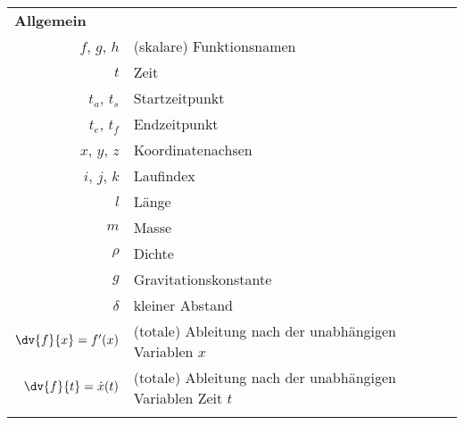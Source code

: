 	\begin{table}
		\centering
		\begin{tabular}{rl}
			\multicolumn{2}{l}{\textbf{Allgemein}}                                                                                                 \\
			\(f\), \(g\), \(h\)                                                & (skalare) Funktionsnamen                                          \\
			\(t\)                                                              & Zeit                                                              \\
			\(t_a\), \(t_s\)                                                   & Startzeitpunkt                                                    \\
			\(t_e\), \(t_f\)                                                   & Endzeitpunkt                                                      \\
			\(x\), \(y\), \(z\)                                                & Koordinatenachsen                                                 \\
			\(i\), \(j\), \(k\)                                                & Laufindex                                                         \\
			\(l\)                                                              & Länge                                                             \\
			\(m\)                                                              & Masse                                                             \\
			\(\rho\)                                                           & Dichte                                                            \\
			\(g\)                                                              & Gravitationskonstante                                             \\
			\(\delta\)                                                         & kleiner Abstand                                                   \\
			\( \dv{f}{x} = f'(x) \)                                            & (totale) Ableitung nach der unabhängigen Variablen \(x\)          \\
			\( \dv{f}{t} = \dot{x}(t) \)                                       & (totale) Ableitung nach der unabhängigen Variablen Zeit \(t\) \\& \\

\end{tabular}
\end{table}
